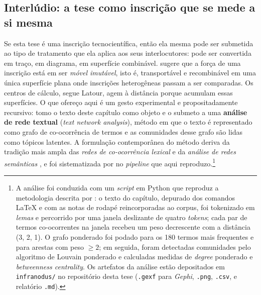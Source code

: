 %

\subsection*{Interlúdio: a tese como inscrição que se mede a si mesma}

Se esta tese é uma inscrição tecnocientífica, então ela mesma pode ser
submetida ao tipo de tratamento que ela aplica aos seus interlocutores:
pode ser convertida em traço, em diagrama, em superfície combinável.
\textcite{Latour1986Visualization} sugere que a força de uma inscrição
está em ser \textit{móvel imutável}, isto é, transportável e
recombinável em uma única superfície plana onde inscrições heterogêneas
passam a ser comparadas. Os centros de cálculo, segue Latour, agem à
distância porque acumulam essas superfícies. O que ofereço aqui é um
gesto experimental e propositadamente recursivo: tomo o texto deste
capítulo como objeto e o submeto a uma \textbf{análise de rede textual}
(\textit{text network analysis}), método em que o texto é representado
como grafo de co-ocorrência de termos e as comunidades desse grafo são
lidas como tópicos latentes. A formulação contemporânea do método
deriva da tradição mais ampla das \textit{redes de co-ocorrência
lexical} \parencite{ferrercancho2001small} e da \textit{análise de
redes semânticas} \parencite{diesner2005revealing}, e foi sistematizada
por \textcite{paranyushkin2019infranodus} no \textit{pipeline} que aqui
reproduzo.\footnote{A análise foi conduzida com um \textit{script} em
Python que reproduz a metodologia descrita por
\textcite{paranyushkin2019infranodus}: o texto do capítulo, depurado
dos comandos \LaTeX{} e com as notas de rodapé reincorporadas ao
corpus, foi tokenizado em \textit{lemas} e percorrido por uma janela
deslizante de quatro \textit{tokens}; cada par de termos co-ocorrentes
na janela recebeu um peso decrescente com a distância (3, 2, 1). O
grafo ponderado foi podado para os 180 termos mais frequentes e para
arestas com peso $\geq 2$; em seguida, foram detectadas comunidades
pelo algoritmo de Louvain ponderado \parencite{blondel2008fast} e
calculadas medidas de \textit{degree} ponderado e \textit{betweenness
centrality}. Os artefatos da análise estão depositados em
\texttt{infranodus/} no repositório desta tese (\texttt{.gexf} para
\textit{Gephi}, \texttt{.png}, \texttt{.csv}, e relatório
\texttt{.md}).}

